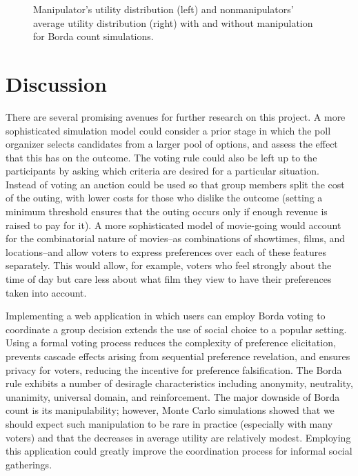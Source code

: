 \documentclass[12pt,letterpaper]{article} %
\begin{document}
\begin{center}
\begin{figure}[h!]
\begin{minipage}{0.45\textwidth}
\begin{center}
\end{center}
\end{minipage}
\caption{Manipulator's utility distribution (left) and nonmanipulators' average utility distribution (right) with and without manipulation for Borda count simulations.}
\label{nonmanip-manip-utils}
\end{figure}
\end{center}



\section{Discussion} 

There are several promising avenues for further research on this project. A more sophisticated simulation model could consider a prior stage in which the poll organizer selects candidates from a larger pool of options, and assess the effect that this has on the outcome. The voting rule could also be left up to the participants by asking which criteria are desired for a particular situation. Instead of voting an auction could be used so that group members split the cost of the outing, with lower costs for those who dislike the outcome (setting a minimum threshold ensures that the outing occurs only if enough revenue is raised to pay for it). A more sophisticated model of movie-going would account for the combinatorial nature of movies--as combinations of showtimes, films, and locations--and allow voters to express preferences over each of these features separately. This would allow, for example, voters who feel strongly about the time of day but care less about what film they view to have their preferences taken into account. 

Implementing a web application in which users can employ Borda voting to coordinate a group decision extends the use of social choice to a popular setting. Using a formal voting process reduces the complexity of preference elicitation, prevents cascade effects arising from sequential preference revelation, and ensures privacy for voters, reducing the incentive for preference falsification. The Borda rule exhibits a number of desiragle characteristics including anonymity, neutrality, unanimity, universal domain, and reinforcement. The major downside of Borda count is its manipulability; however, Monte Carlo simulations showed that we should expect such manipulation to be rare in practice (especially with many voters) and that the decreases in average utility are relatively modest. Employing this application could greatly improve the coordination process for informal social gatherings. 
\end{document}
